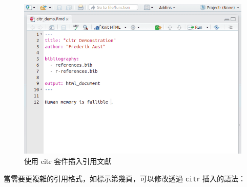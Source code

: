 \documentclass[oneside]{book}
\theoremstyle{definition}
\theoremstyle{definition}
\theoremstyle{definition}
\theoremstyle{remark}
\begin{document}
\begin{figure}[H]

{\centering \includegraphics[width=1\linewidth]{figs/citr} 

}

\caption{使用 citr 套件插入引用文獻}\label{fig:unnamed-chunk-5}
\end{figure}

當需要更複雜的引用格式，如標示第幾頁，可以修改透過 \texttt{citr}
插入的語法：
\end{document}
